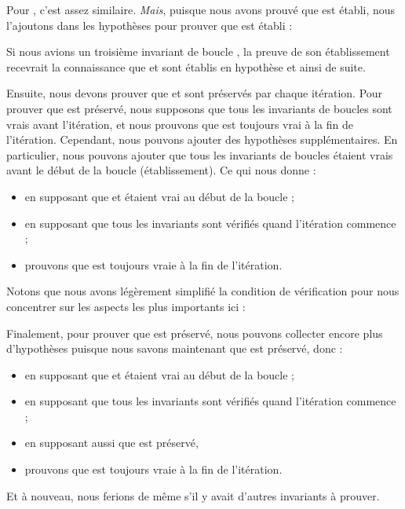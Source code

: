 

Pour , c'est assez similaire. \textit{Mais}, puisque nous avons
prouvé que  est établi, nous l'ajoutons dans les hypothèses pour
prouver que  est établi :




Si nous avions un troisième invariant de boucle , la preuve de
son établissement recevrait la connaissance que  et 
sont établis en hypothèse et ainsi de suite.


Ensuite, nous devons prouver que  et  sont
préservés par chaque itération. Pour prouver que  est préservé,
nous supposons que tous les invariants de boucles sont vrais avant l'itération,
et nous prouvons que  est toujours vrai à la fin de l'itération.
Cependant, nous pouvons ajouter des hypothèses supplémentaires. En particulier,
nous pouvons ajouter que tous les invariants de boucles étaient vrais avant le
début de la boucle (établissement). Ce qui nous donne :
\begin{itemize}
  \item en supposant que  et  étaient vrai au
        début de la boucle ;
  \item en supposant que tous les invariants sont vérifiés quand l'itération
        commence ;
  \item prouvons que  est toujours vraie à la fin de l'itération.
\end{itemize}
Notons que nous avons légèrement simplifié la condition de vérification pour
nous concentrer sur les aspects les plus importants ici :




Finalement, pour prouver que  est préservé, nous pouvons
collecter encore plus d'hypothèses puisque nous savons maintenant que
 est préservé, donc :
\begin{itemize}
  \item en supposant que  et  étaient vrai au
        début de la boucle ;
  \item en supposant que tous les invariants sont vérifiés quand l'itération
        commence ;
  \item en supposant aussi que  est préservé,
  \item prouvons que  est toujours vraie à la fin de l'itération.
\end{itemize}
Et à nouveau, nous ferions de même s'il y avait d'autres invariants à prouver.


